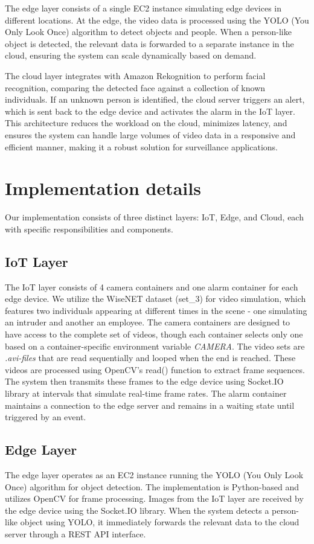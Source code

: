 \documentclass[conference]{IEEEtran}
\begin{document}
The edge layer consists of a single EC2 instance simulating edge devices in different locations. At the edge, the video data is processed using the YOLO (You Only Look Once) algorithm to detect objects and people. When a person-like object is detected, the relevant data is forwarded to a separate instance in the cloud, ensuring the system can scale dynamically based on demand.

The cloud layer integrates with Amazon Rekognition to perform facial recognition, comparing the detected face against a collection of known individuals. If an unknown person is identified, the cloud server triggers an alert, which is sent back to the edge device and activates the alarm in the IoT layer. This architecture reduces the workload on the cloud, minimizes latency, and ensures the system can handle large volumes of video data in a responsive and efficient manner, making it a robust solution for surveillance applications.



\section{Implementation details}
Our implementation consists of three distinct layers: IoT, Edge, and Cloud, each with specific responsibilities and components.

\subsection{IoT Layer}
The IoT layer consists of 4 camera containers and one alarm container for each edge device. We utilize the WiseNET dataset (set\_3) for video simulation, which features two individuals appearing at different times in the scene - one simulating an intruder and another an employee. The camera containers are designed to have access to the complete set of videos, though each container selects only one based on a container-specific environment variable \textit{CAMERA}. The video sets are \textit{.avi-files} that are read sequentially and looped when the end is reached. 
These videos are processed using OpenCV's read() function to extract frame sequences. The system then transmits these frames to the edge device using Socket.IO library at intervals that simulate real-time frame rates. The alarm container maintains a connection to the edge server and remains in a waiting state until triggered by an event.

\subsection{Edge Layer}
The edge layer operates as an EC2 instance running the YOLO (You Only Look Once) algorithm for object detection. The implementation is Python-based and utilizes OpenCV for frame processing. Images from the IoT layer are received by the edge device using the Socket.IO library. When the system detects a person-like object using YOLO, it immediately forwards the relevant data to the cloud server through a REST API interface.
\end{document}
